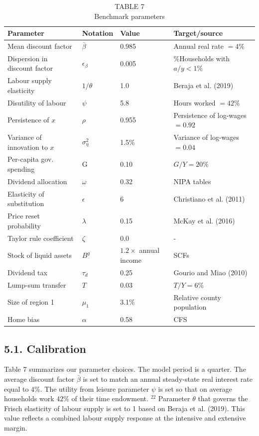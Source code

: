 \documentclass[10pt]{article}
\begin{document}
\begin{table}[h]
\begin{center}
\captionsetup{labelformat=empty}
\caption{TABLE 7\\
Benchmark parameters}
\begin{tabular}{|l|l|l|l|}
\hline
Parameter & Notation & Value & Target/source \\
\hline
Mean discount factor & $\bar{\beta}$ & 0.985 & Annual real rate $=4 \%$ \\
\hline
Dispersion in discount factor & $\epsilon_{\beta}$ & 0.005 & \%Households with $a / y<1 \%$ \\
\hline
Labour supply elasticity & $1 / \theta$ & 1.0 & Beraja et al. (2019) \\
\hline
Disutility of labour & $\psi$ & 5.8 & Hours worked $=42 \%$ \\
\hline
Persistence of $x$ & $\rho$ & 0.955 & Persistence of log-wages $=0.92$ \\
\hline
Variance of innovation to $x$ & $\sigma_{\eta}^{2}$ & 1.5\% & Variance of log-wages $=0.04$ \\
\hline
Per-capita gov. spending & G & 0.10 & $G / Y=20 \%$ \\
\hline
Dividend allocation & $\omega$ & 0.32 & NIPA tables \\
\hline
Elasticity of substitution & $\epsilon$ & 6 & Christiano et al. (2011) \\
\hline
Price reset probability & $\lambda$ & 0.15 & McKay et al. (2016) \\
\hline
Taylor rule coefficient & $\zeta$ & 0.0 & - \\
\hline
Stock of liquid assets & $B^{g}$ & $1.2 \times$ annual income & SCFs \\
\hline
Dividend tax & $\tau_{d}$ & 0.25 & Gourio and Miao (2010) \\
\hline
Lump-sum transfer & $T$ & 0.03 & $T / Y=6 \%$ \\
\hline
Size of region 1 & $\mu_{1}$ & 3.1\% & Relative county population \\
\hline
Home bias & $\alpha$ & 0.58 & CFS \\
\hline
\end{tabular}
\end{center}
\end{table}

\subsection*{5.1. Calibration}
Table 7 summarizes our parameter choices. The model period is a quarter. The average discount factor $\bar{\beta}$ is set to match an annual steady-state real interest rate equal to $4 \%$. The utility from leisure parameter $\psi$ is set so that on average households work $42 \%$ of their time endowment. ${ }^{22}$ Parameter $\theta$ that governs the Frisch elasticity of labour supply is set to 1 based on Beraja et al. (2019). This value reflects a combined labour supply response at the intensive and extensive margin.
\end{document}
